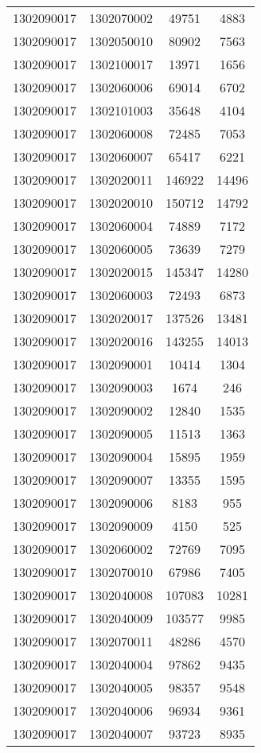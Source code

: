 \begin{longtable}[h]{llcc}
		1302090017 & 1302070002 & 49751 & 4883\\
		1302090017 & 1302050010 & 80902 & 7563\\
		1302090017 & 1302100017 & 13971 & 1656\\
		1302090017 & 1302060006 & 69014 & 6702\\
		1302090017 & 1302101003 & 35648 & 4104\\
		1302090017 & 1302060008 & 72485 & 7053\\
		1302090017 & 1302060007 & 65417 & 6221\\
		1302090017 & 1302020011 & 146922 & 14496\\
		1302090017 & 1302020010 & 150712 & 14792\\
		1302090017 & 1302060004 & 74889 & 7172\\
		1302090017 & 1302060005 & 73639 & 7279\\
		1302090017 & 1302020015 & 145347 & 14280\\
		1302090017 & 1302060003 & 72493 & 6873\\
		1302090017 & 1302020017 & 137526 & 13481\\
		1302090017 & 1302020016 & 143255 & 14013\\
		1302090017 & 1302090001 & 10414 & 1304\\
		1302090017 & 1302090003 & 1674 & 246\\
		1302090017 & 1302090002 & 12840 & 1535\\
		1302090017 & 1302090005 & 11513 & 1363\\
		1302090017 & 1302090004 & 15895 & 1959\\
		1302090017 & 1302090007 & 13355 & 1595\\
		1302090017 & 1302090006 & 8183 & 955\\
		1302090017 & 1302090009 & 4150 & 525\\
		1302090017 & 1302060002 & 72769 & 7095\\
		1302090017 & 1302070010 & 67986 & 7405\\
		1302090017 & 1302040008 & 107083 & 10281\\
		1302090017 & 1302040009 & 103577 & 9985\\
		1302090017 & 1302070011 & 48286 & 4570\\
		1302090017 & 1302040004 & 97862 & 9435\\
		1302090017 & 1302040005 & 98357 & 9548\\
		1302090017 & 1302040006 & 96934 & 9361\\
		1302090017 & 1302040007 & 93723 & 8935\\

\end{longtable}
